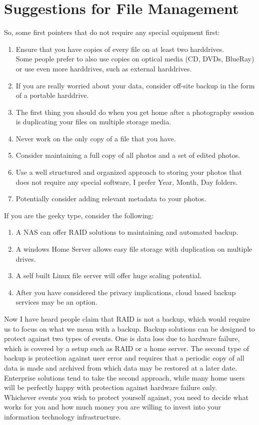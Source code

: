 \section{Suggestions for File Management}

So, some first pointers that do not require any special equipment first:

\begin{enumerate}
	\item Ensure that you have copies of every file on at least two harddrives. 
	\\ Some people prefer to also use copies on optical media (CD, DVDs, BlueRay) or use even more harddrives, such as external harddrives.
	\item If you are really worried about your data, consider off-site backup in the form of a portable harddrive.
	\item The first thing you should do when you get home after a photography session is duplicating your files on multiple storage media.
	\item Never work on the only copy of a file that you have.
	\item Consider maintaining a full copy of all photos and a set of edited photos.
	\item Use a well structured and organized approach to storing your photos that does not require any special software, I prefer Year, Month, Day folders.
	\item Potentially consider adding relevant metadata to your photos.
\end{enumerate}

If you are the geeky type, consider the following:

\begin{enumerate}
	\item A NAS can offer RAID solutions to maintaining and automated backup.
	\item A windows Home Server allows easy file storage with duplication on multiple drives.
	\item A self built Linux file server will offer huge scaling potential.
	\item After you have considered the privacy implications, cloud based backup services may be an option.
\end{enumerate}

Now I have heard people claim that RAID is not a backup, which would require us to focus on what we mean with a backup. 
Backup solutions can be designed to protect against two types of events. One is data loss due to hardware failure, which is covered by a setup such as RAID or a home server. The second type of backup is protection against user error and requires that a periodic copy of all data is made and archived from which data may be restored at a later date. Enterprise solutions tend to take the second approach, while many home users will be perfectly happy with protection against hardware failure only.
\\[\baselineskip]
Whichever events you wish to protect yourself against, you need to decide what works for you and how much money you are willing to invest into your information technology infrastructure.



